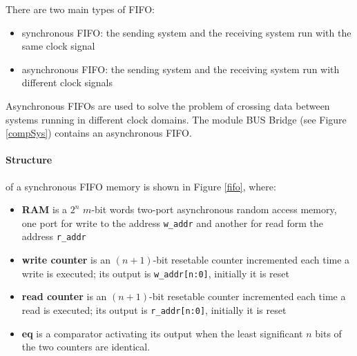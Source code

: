 There are two main types of FIFO:
\begin{itemize}
    \item synchronous FIFO: the sending system and the receiving system run with the same clock signal 
    
    \item asynchronous FIFO: the sending system and the receiving system run with different clock signals
\end{itemize}


Asynchronous FIFOs are used to solve the problem of crossing data between systems running in different clock domains. The module BUS Bridge (see Figure \ref{compSys}) contains an asynchronous FIFO.

\paragraph{Structure} of a synchronous FIFO memory is shown in Figure \ref{fifo}, where:



\begin{itemize}
    \item {\bf RAM} is a $2^{n}$ $m$-bit words two-port asynchronous random access memory, one
    port for write to the address {\tt w\_addr} and another for
    read form the address {\tt r\_addr}
    \item {\bf write counter} is an $(n+1)$-bit resetable counter incremented
    each time a write is executed; its output is {\tt w\_addr[n:0]}, initially
    it is reset
    \item {\bf read counter} is an $(n+1)$-bit resetable counter incremented
    each time a read is executed; its output is {\tt r\_addr[n:0]}, initially it is reset
    \item {\bf eq} is a comparator activating its output when
    the least significant $n$ bits of the two counters are
    identical.
\end{itemize}

